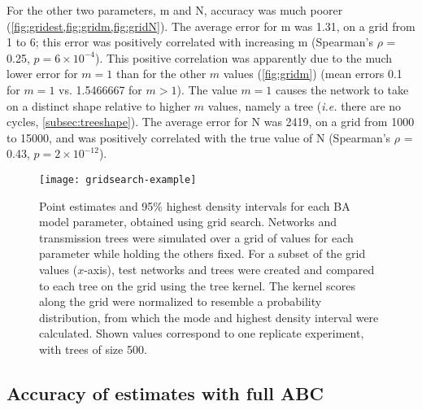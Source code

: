 For the other two parameters, \gls{m} and \gls{N}, accuracy was much poorer
(\cref{fig:gridest,fig:gridm,fig:gridN}). The average error for \gls{m} was
    1.31,
on a grid from 1 to 6; this error was positively correlated with increasing
\gls{m}
    (Spearman's $\rho$ = 0.25,
     $p = 6\!\times\!10^{-4}$).
This positive correlation was apparently due to the much lower error for $m =
1$ than for the other $m$ values (\cref{fig:gridm})
    (mean errors 0.1 for
     $m = 1$ vs. 1.5466667 for
     $m > 1$).
The value $m = 1$ causes the network to take on a distinct shape relative to
higher $m$ values, namely a tree (\textit{i.e.} there are no cycles,
\cref{subsec:treeshape}). The average error for \gls{N} was 
    2419,
on a grid from 1000 to 15000, and was positively correlated with the true value
of \gls{N}
    (Spearman's $\rho$ = 0.43,
     $p = 2\!\times\!10^{-12}$).

\begin{figure}[ht]
  \centering
  \texttt{[image: gridsearch-example]}
  \caption[Grid search estimates of \gls{BA} model parameters]{Point estimates
      and 95\% highest density intervals for each \gls{BA} model parameter,
      obtained using grid search. Networks and transmission trees were
      simulated over a grid of values for each parameter while holding the
      others fixed. For a subset of the grid values ($x$-axis), test networks
      and trees were created and compared to each tree on the grid using the
      tree kernel. The kernel scores along the grid were normalized to resemble
      a probability distribution, from which the mode and highest density
      interval were calculated. Shown values correspond to one replicate
      experiment, with trees of size 500.
  } 
  \label{fig:gridest}
\end{figure}

\subsection{Accuracy of estimates with full ABC}



